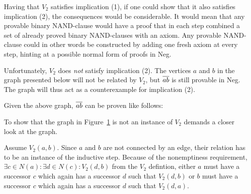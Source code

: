 Having that $V_2$ satisfies implication (1), if one could show that it also satisfies implication (2), the consequences would be considerable.
It would mean that any provable binary NAND-clause would have a proof that in each step combined a set of already proved binary NAND-clauses with an axiom.
Any provable NAND-clause could in other words be constructed by adding one fresh axiom at every step, hinting at a possible normal form of proofs in Neg.

Unfortunately, $V_2$ does \textit{not} satisfy implication (2).
The vertices $a$ and $b$ in the graph presented below will not be related by $V_2$, but $\ol{ab}$ is still provable in Neg.
The graph will thus act as a counterexample for implication (2).\par
\begin{figure}[!h]
  \centering
  \caption{}
  \label{fig:v2_counter_graph}
\end{figure}
Given the above graph, $\ol{ab}$ can be proven like follows:\par
\begin{figure}[!h]
  \centering
  \begin{prooftree*}
  \end{prooftree*}
  \caption{}
  \label{fig:v2_counter_proof}
\end{figure}
To show that the graph in Figure~\ref{fig:v2_counter_graph} is not an instance of $V_2$ demands a closer look at the graph.

Assume $V_2(a,b)$.
Since $a$ and $b$ are not connected by an edge, their relation has to be an instance of the inductive step.
Because of the nonemptiness requirement, $\exists c \in N(a):\exists d \in N(c): V_2(d,b)$ from the $V_2$ defintion, either $a$  must have a successor $c$ which again has a successor $d$ such that $V_2(d,b)$ or $b$ must have a successor $c$ which again has a successor $d$ such that $V_2(d,a)$.


